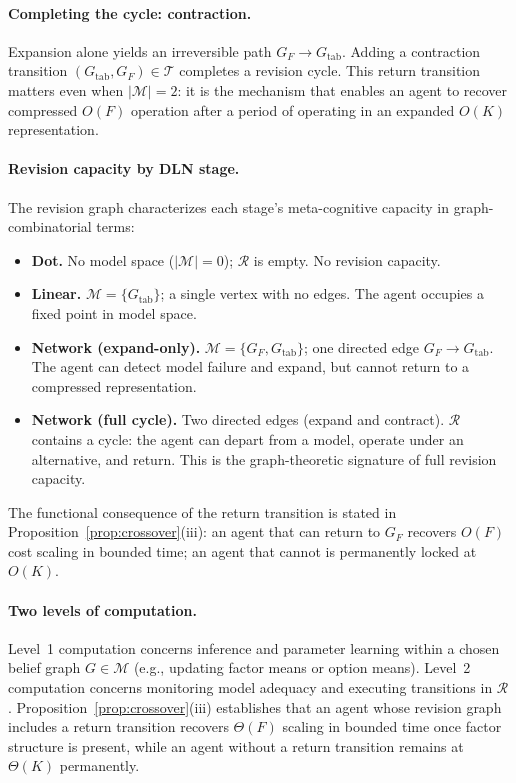 \documentclass[11pt]{article}
\begin{document}
\paragraph{Completing the cycle: contraction.}
Expansion alone yields an irreversible path $G_F \rightarrow
G_{\mathrm{tab}}$.  Adding a contraction transition
$(G_{\mathrm{tab}},G_F)\in\mathcal{T}$ completes a revision cycle.  This return
transition matters even when $|\mathcal{M}|=2$: it is the mechanism that
enables an agent to recover compressed $O(F)$ operation after a period of
operating in an expanded $O(K)$ representation.

\paragraph{Revision capacity by DLN stage.}
The revision graph characterizes each stage's meta-cognitive capacity in
graph-combinatorial terms:
%
\begin{itemize}[leftmargin=*]
\item \textbf{Dot.}  No model space ($|\mathcal{M}|=0$); $\mathcal{R}$
  is empty.  No revision capacity.
\item \textbf{Linear.}  $\mathcal{M} = \{G_{\mathrm{tab}}\}$; a single
  vertex with no edges.  The agent occupies a fixed point in model space.
\item \textbf{Network (expand-only).}  $\mathcal{M} =
  \{G_F, G_{\mathrm{tab}}\}$; one directed edge
  $G_F \to G_{\mathrm{tab}}$.  The agent can detect model failure and
  expand, but cannot return to a compressed representation.
\item \textbf{Network (full cycle).}  Two directed edges (expand and
  contract).  $\mathcal{R}$ contains a cycle: the agent can depart from a
  model, operate under an alternative, and return.  This is the
  graph-theoretic signature of full revision capacity.
\end{itemize}
%
The functional consequence of the return transition is stated in
Proposition~\ref{prop:crossover}(iii): an agent that can return to
$G_F$ recovers $O(F)$ cost scaling in bounded time; an agent that
cannot is permanently locked at $O(K)$.

\paragraph{Two levels of computation.}
Level~1 computation concerns inference and parameter learning within a chosen
belief graph $G\in\mathcal{M}$ (e.g., updating factor means or option means).
Level~2 computation concerns monitoring model adequacy and executing transitions
in $\mathcal{R}$.  Proposition~\ref{prop:crossover}(iii) establishes that an
agent whose revision graph includes a return transition recovers $\Theta(F)$
scaling in bounded time once factor structure is present, while an agent without
a return transition remains at $\Theta(K)$ permanently.
\end{document}
